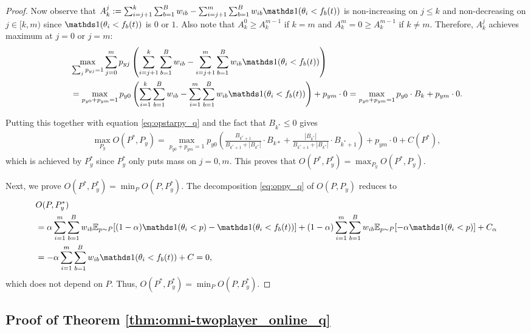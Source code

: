 \begin{proof}
  Now observe that $A_k^j := \sum_{i=j+1}^{k} \sum_{b=1}^B w_{ib} - \sum_{i=j+1}^{m} \sum_{b=1}^B w_{ib} \one(\theta_i < f_b(t))$ is non-increasing on $j\leq k$ and non-decreasing on $j \in [k, m)$ since $\one(\theta_i < f_b(t))$ is $0$ or $1$. Also note that $A_k^0 \geq A_k^{m-1}$ if $k=m$ and $A_k^m = 0 \geq A_k^{m-1}$ if $k \neq m$. Therefore, $A_k^j$ achieves maximum at $j=0$ or $j=m$:
  \begin{align*}
  & \max_{\sum_j{p_{yj}}=1}\sum_{j=0}^{m} p_{yj} \left(\sum_{i=j+1}^{k} \sum_{b=1}^B w_{ib} - \sum_{i=j+1}^{m} \sum_{b=1}^B w_{ib} \one(\theta_i < f_b(t))\right) \\
  &= \max_{p_{y0}+p_{ym}=1} p_{y0}\left(\sum_{i=1}^{k} \sum_{b=1}^B w_{ib} - \sum_{i=1}^{m} \sum_{b=1}^B w_{ib} \one(\theta_i < f_b(t))\right) + p_{ym}\cdot 0 
  = \max_{p_{y0}+p_{ym}=1} p_{y0} \cdot B_k + p_{ym} \cdot 0.%
  \end{align*}
  
  Putting this together with equation \eqref{eq:opstarpy_q} and the fact that $B_{k^*}\leq 0$ gives
  \begin{align*}
  \max_{P_y}O(P^*, P_y) = \max_{p_{y0}+p_{ym}=1} p_{y0} \left(\frac{B_{k^*+1}}{B_{k^*+1} + |B_{k^*}|} \cdot B_{k*} + \frac{|B_{k^*}|}{B_{k^*+1} + |B_{k^*}|} \cdot B_{k^*+1}\right) + p_{ym}\cdot 0 + C(P^*),
  \end{align*}
  which is achieved by $P_y^*$ since $P_y^*$ only puts mass on $j=0, m$. This proves that $O(P^*, P_y^*) = \max_{P_y} O(P^*, P_y)$.
  
  \smallskip
  Next, we prove $O(P^*, P_y^*) = \min_P O(P, P_y^*)$. The decomposition \eqref{eq:oppy_q} of $O(P, P_y)$ reduces to
  \begin{align*}
  & O(P, P_y^*)  \\ 
  &= \alpha \sum_{i=1}^{m} \sum_{b=1}^B w_{ib}\E_{p\sim P}[(1-\alpha)\one(\theta_i < p) - \one(\theta_i < f_b(t))] + 
  (1-\alpha) \sum_{i=1}^{m} \sum_{b=1}^B w_{ib}\E_{p\sim P}[-\alpha\one(\theta_i < p)] + C_\alpha \\
  &= -\alpha \sum_{i=1}^{m} \sum_{b=1}^B w_{ib}\one(\theta_i < f_b(t)) + C = 0,
  \end{align*}
  which does not depend on $P$. Thus, $O(P^*, P_y^*) = \min_P O(P, P_y^*)$.
\end{proof}


\subsection{Proof of Theorem \ref{thm:omni-twoplayer_online_q}} \label{pf:omni-twoplayer_online_q}

